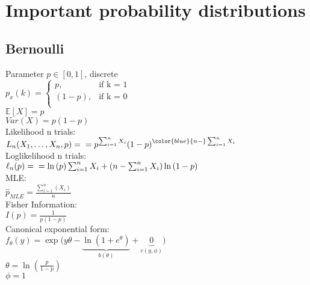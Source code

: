 \section{Important probability distributions}
\subsection*{Bernoulli}
Parameter $p \in[0,1]$, discrete\\
$ p_x(k)=
	\begin{cases}
		 p,&\text{if k = 1}\\
		(1-p),&\text{if k = 0}\\
	\end{cases}
$\\

$\mathbb{E}[X]=p$\\

$Var(X)=p(1-p)$\\

Likelihood n trials:\\

$L_ n(X_1, \ldots , X_ n, p) =\\
= p^{\sum _{i = 1}^ n X_ i} (1 -p)^{{\color{blue}{n - }} \sum _{i = 1}^ n X_ i}$ \\

Loglikelihood n trials:\\

$\ell_n (p) = \\ = \ln  \left( p \right) \sum _{i=1}^{n}X_{{i}}+ \left( n-\sum _{i=1}^{n}
X_{{i}} \right) \ln  \left( 1-p \right) 
$\\

MLE:\\

$\hat{p}_{MLE} = \frac{\sum^n_{i=1}(X_i)}{n}$\\

Fisher Information:\\

$I(p) = \frac{1}{p(1-p)}$\\

Canonical exponential form:\\

$f_{\theta}(y)=\exp\big(y\theta - \underbrace{\ln(1 + e^\theta)}_{b(\theta)} + \underbrace{0}_{c(y, \phi)}\big) \quad$\\

$\theta = \ln\left(\frac{p}{1-p}\right)$\\
$\phi = 1$\\

